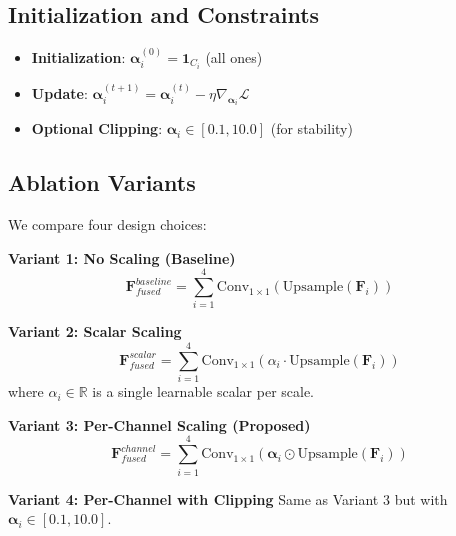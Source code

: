 \subsection{Initialization and Constraints}

\begin{itemize}
    \item \textbf{Initialization}: $\boldsymbol{\alpha}_i^{(0)} = \mathbf{1}_{C_i}$ (all ones)
    \item \textbf{Update}: $\boldsymbol{\alpha}_i^{(t+1)} = \boldsymbol{\alpha}_i^{(t)} - \eta \nabla_{\boldsymbol{\alpha}_i} \mathcal{L}$
    \item \textbf{Optional Clipping}: $\boldsymbol{\alpha}_i \in [0.1, 10.0]$ (for stability)
\end{itemize}

\subsection{Ablation Variants}

We compare four design choices:

\textbf{Variant 1: No Scaling (Baseline)}
\begin{equation}
\mathbf{F}_{fused}^{baseline} = \sum_{i=1}^{4} \text{Conv}_{1\times1}(\text{Upsample}(\mathbf{F}_i))
\end{equation}

\textbf{Variant 2: Scalar Scaling}
\begin{equation}
\mathbf{F}_{fused}^{scalar} = \sum_{i=1}^{4} \text{Conv}_{1\times1}(\alpha_i \cdot \text{Upsample}(\mathbf{F}_i))
\end{equation}
where $\alpha_i \in \mathbb{R}$ is a single learnable scalar per scale.

\textbf{Variant 3: Per-Channel Scaling (Proposed)}
\begin{equation}
\mathbf{F}_{fused}^{channel} = \sum_{i=1}^{4} \text{Conv}_{1\times1}(\boldsymbol{\alpha}_i \odot \text{Upsample}(\mathbf{F}_i))
\end{equation}

\textbf{Variant 4: Per-Channel with Clipping}
Same as Variant 3 but with $\boldsymbol{\alpha}_i \in [0.1, 10.0]$.

